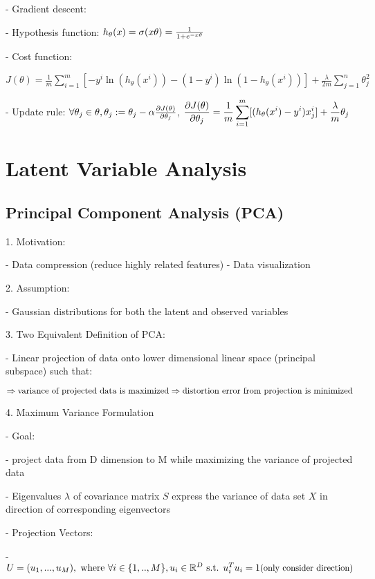 - Gradient descent:

- Hypothesis function: $h_\theta(x)=\sigma(x\theta)=\large\frac{1}{1+e^{-x\theta}}$ 

- Cost function: 

$\displaystyle J(\theta)=\frac{1}{m}\sum^m_{i=1}[-y^i \ln (h_\theta(x^i))-(1-y^i) \ln (1-h_\theta(x^i))]+\frac{\lambda}{2m}\sum^n_{j=1}\theta_j^2$ 

- Update rule: $\forall \theta_j \in \theta, \theta_j := \theta_j-\alpha\large\frac{\partial J(\theta)}{\partial\theta_j}$, $\displaystyle \small\frac{\partial J(\theta)}{\partial\theta_j}=\frac{1}{m}\sum^m_{i=1}[(h_\theta(x^i)-y^i)x_j^i] + \frac \lambda m\theta_j$ 

\section{Latent Variable Analysis}

\subsection{Principal Component Analysis (PCA)}

1. Motivation:

- Data compression (reduce highly related features)
- Data visualization

2. Assumption:

- Gaussian distributions for both the latent and observed variables

3. Two Equivalent Definition of PCA:

- Linear projection of data onto lower dimensional linear space (principal subspace) such that: 

$\Rightarrow \text{variance of projected data is maximized} \\ \Rightarrow \text{distortion error from projection is minimized} $ 

4. Maximum Variance Formulation

- Goal: 

- project data from D dimension to M while maximizing the variance of projected data

- Eigenvalues $\lambda$ of covariance matrix $S$ express the variance of data set $X$ in direction of corresponding eigenvectors

- Projection Vectors: 

- $U = (u_1,...,u_M), \text{ where } \forall i\in\{1,..,M\},u_i \in \mathbb R^D \text{ s.t. } u_i^Tu_i=1 \space \small \text{(only consider direction)} $ 

